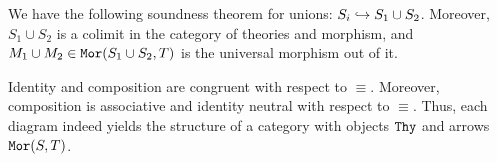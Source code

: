 \begin{example}\label{rel:union}
We have the following soundness theorem for unions: $S_i\hookrightarrow S_1\cup S_2$.
Moreover, $S_1\cup S_2$ is a colimit in the category of theories and morphism, and $M_1\cup M_2\in\mathtt{Mor}(S_1\cup S_2,T)$ is the universal morphism out of it.
\end{example}

\begin{example}\label{rel:cat}
Identity and composition are congruent with respect to $\equiv$.
Moreover, composition is associative and identity neutral with respect to $\equiv$.
Thus, each diagram indeed yields the structure of a category with objects $\mathtt{Thy}$ and arrows $\mathtt{Mor}(S,T)$.
\end{example}
